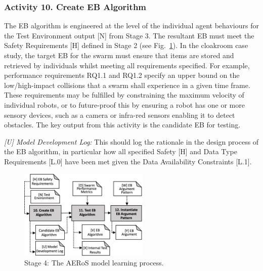 \documentclass[runningheads]{llncs}
\begin{document}
\subsubsection*{Activity 10. Create EB Algorithm}

The EB algorithm is engineered at the level of the individual agent behaviours for the Test Environment output [N] from Stage 3. The resultant EB must meet the Safety Requirements [H] defined in Stage 2 (see Fig.~\ref{amlas-a-stage4}). 
In the cloakroom case study, the target EB for the swarm must ensure that items are stored and retrieved by individuals whilst meeting all requirements specified. For example, performance requirements RQ1.1 and RQ1.2 specify an upper bound on the low/high-impact collisions that a swarm shall experience in a given time frame. 
These requirements may be fulfilled by constraining the maximum velocity of individual robots, or to future-proof this by ensuring a robot has one or more sensory devices, such as a camera or infra-red sensors enabling it to detect obstacles. 
The key output from this activity is the candidate EB for testing.

\emph{[U] Model Development Log:} This should log the rationale in the design process of the EB algorithm, in particular how all specified Safety [H] and Data Type Requirements [L.0] have been met given the Data Availability Constraints [L.1].

\begin{figure}[!t]
	\centering
	\includegraphics[width=0.55\textwidth]{figures/AMLAS-STAGE-4-V5.png}%
	\vspace{-2ex}
	\caption{Stage 4: The AERoS model learning process.}
	\label{amlas-a-stage4}
	\vspace{-4ex}
\end{figure}
\end{document}
